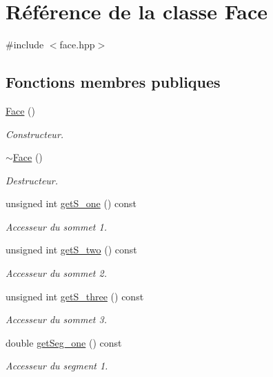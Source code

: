 \hypertarget{class_face}{\section{Référence de la classe Face}
\label{class_face}
}


{\ttfamily \#include $<$face.\-hpp$>$}

\subsection*{Fonctions membres publiques}
\begin{DoxyCompactItemize}
\item 
\hyperlink{class_face_afdb634bc2d5287ba0d62e46b57e9dc2e}{Face} ()
\begin{DoxyCompactList}\small\item\em Constructeur. \end{DoxyCompactList}\item 
\hyperlink{class_face_a182c8c9ba652d46b01fdf6816cd65590}{$\sim$\-Face} ()
\begin{DoxyCompactList}\small\item\em Destructeur. \end{DoxyCompactList}\item 
unsigned int \hyperlink{class_face_ac6ce8497a59d3de67cd861a1d3aeb1ee}{get\-S\-\_\-one} () const 
\begin{DoxyCompactList}\small\item\em Accesseur du sommet 1. \end{DoxyCompactList}\item 
unsigned int \hyperlink{class_face_a2106a9b3661a4dcb41306a7010106221}{get\-S\-\_\-two} () const 
\begin{DoxyCompactList}\small\item\em Accesseur du sommet 2. \end{DoxyCompactList}\item 
unsigned int \hyperlink{class_face_a5bb2a3e263ede7ed39eb044ef7b5e8c7}{get\-S\-\_\-three} () const 
\begin{DoxyCompactList}\small\item\em Accesseur du sommet 3. \end{DoxyCompactList}\item 
double \hyperlink{class_face_a906d16f2f1c9adbe881ae46ee7f3e3e9}{get\-Seg\-\_\-one} () const 
\begin{DoxyCompactList}\small\item\em Accesseur du segment 1. \end{DoxyCompactList}\item 

\end{DoxyCompactItemize}
